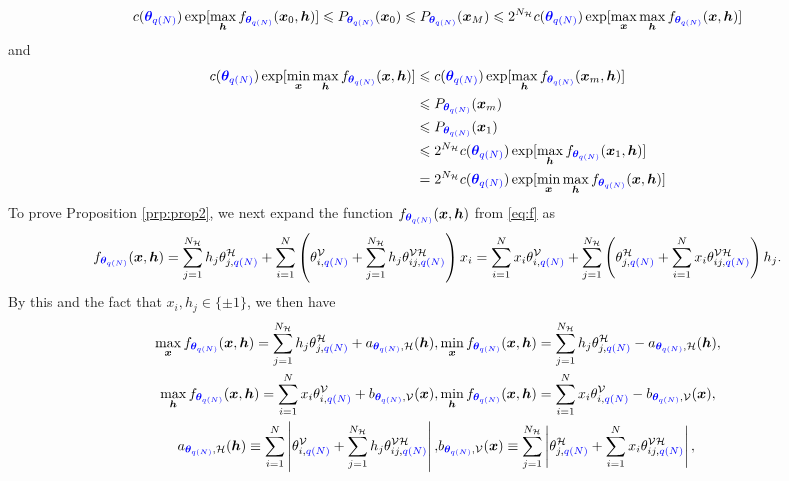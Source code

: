 \documentclass[numbib]{imamat}
\theoremstyle{theorem}
\theoremstyle{lemma}
\theoremstyle{example}
\theoremstyle{corollary}
\theoremstyle{definition}
\theoremstyle{remark}
\theoremstyle{approximation}
\theoremstyle{scheme}
\newcommand{\thetaidx}{q(N)}
\newcommand{\thetaN}{\boldsymbol \theta_{\thetaidx}}
\newcommand{\ak}[1]{{\color{blue} #1}}
\begin{document}
\[
c(\ak{\thetaN}) \exp[\max_{\boldsymbol h}f_{\ak{\thetaN}} (\boldsymbol x_0 , \boldsymbol h)]
\leq P_{\ak{\thetaN}} (\boldsymbol x_0) \leq  P_{\ak{\thetaN}} (\boldsymbol x_M) \leq  2^{N_{\mathcal{H}}} c(\ak{\thetaN}) \exp[\max_{\boldsymbol x}\max_{\boldsymbol h}f_{\ak{\thetaN}} (\boldsymbol x, \boldsymbol h)]
\]
and
\begin{align*}
c(\ak{\thetaN}) \exp[\min_{\boldsymbol x}\max_{\boldsymbol h}f_{\ak{\thetaN}} (\boldsymbol x , \boldsymbol h)] &\leq c(\ak{\thetaN}) \exp[ \max_{\boldsymbol h}f_{\ak{\thetaN}} (\boldsymbol x_m , \boldsymbol h)] \\
&\leq P_{\ak{\thetaN}} (\boldsymbol x_m) \\
&\leq P_{\ak{\thetaN}} (\boldsymbol x_1) \\ 
&\leq 2^{N_{\mathcal{H}}} c(\ak{\thetaN}) \exp[ \max_{\boldsymbol h}f_{\ak{\thetaN}} (\boldsymbol x_1 , \boldsymbol h)]\\
&=2^{N_{\mathcal{H}}} c(\ak{\thetaN}) \exp[\min_{\boldsymbol x}\max_{\boldsymbol h}f_{\ak{\thetaN}} (\boldsymbol x , \boldsymbol h)]
\end{align*}
To prove Proposition \ref{prp:prop2}, we next expand the function \(f_{\ak{\thetaN}} (\boldsymbol x, \boldsymbol h)\) from \eqref{eq:f} as
\[
f_{\ak{\thetaN}} (\boldsymbol x, \boldsymbol h)= \sum_{j=1}^{N_\mathcal{H}} h_j \theta_{j,\ak{\thetaidx}}^{\mathcal{H}}  +   \sum_{i=1}^N \left( \theta_{i,\ak{\thetaidx}}^{\mathcal{V}} + \sum_{j=1}^{N_\mathcal{H}}  h_j  \theta_{ij,\ak{\thetaidx}}^{\mathcal{VH}}\right)x_i=\sum_{i=1}^N x_i  \theta_{i,\ak{\thetaidx}}^{\mathcal{V}} +  \sum_{j=1}^{N_\mathcal{H}} \left( \theta_{j,\ak{\thetaidx}}^{\mathcal{H}}  + \sum_{i=1}^N  x_i  \theta_{ij,\ak{\thetaidx}}^{\mathcal{VH}}\right)h_j.
\]
By this and the fact that \(x_i,h_j\in\{\pm 1\}\), we then have
\begin{align}
\nonumber \max_{\boldsymbol x}  f_{\ak{\thetaN}} (\boldsymbol x, \boldsymbol h) =  \sum_{j=1}^{N_\mathcal{H}} h_j \theta_{j,\ak{\thetaidx}}^{\mathcal{H}}  +   a_{\ak{\thetaN}, \mathcal{H}} (\boldsymbol h), & \min_{\boldsymbol x}  f_{\ak{\thetaN}} (\boldsymbol x, \boldsymbol h) =  \sum_{j=1}^{N_\mathcal{H}} h_j \theta_{j,\ak{\thetaidx}}^{\mathcal{H}}  - a_{\ak{\thetaN}, \mathcal{H}} (\boldsymbol h),\\
\nonumber \max_{\boldsymbol h}  f_{\ak{\thetaN}} (\boldsymbol x, \boldsymbol h) = \sum_{i=1}^{N}x_i \theta_{i,\ak{\thetaidx}}^{\mathcal{V}} + b_{\ak{\thetaN}, \mathcal{V}} (\boldsymbol x), & \min_{\boldsymbol h}  f_{\ak{\thetaN}} (\boldsymbol x, \boldsymbol h) = \sum_{i=1}^{N}x_i \theta_{i,\ak{\thetaidx}}^{\mathcal{V}}  -   b_{\ak{\thetaN}, \mathcal{V}} (\boldsymbol x), \\ 
\label{eq:max}
a_{\ak{\thetaN}, \mathcal{H}} (\boldsymbol h) \equiv \sum_{i=1}^N \left| \theta_{i,\ak{\thetaidx}}^{\mathcal{V}} + \sum_{j=1}^{N_\mathcal{H}}  h_j  \theta_{ij,\ak{\thetaidx}}^{\mathcal{VH}}\right|, &  b_{\ak{\thetaN}, \mathcal{V}} (\boldsymbol x) \equiv \sum_{j=1}^{N_\mathcal{H}} \left| \theta_{j,\ak{\thetaidx}}^{\mathcal{H}}  + \sum_{i=1}^N  x_i  \theta_{ij,\ak{\thetaidx}}^{\mathcal{VH}}\right|,
\end{align}
\end{document}

